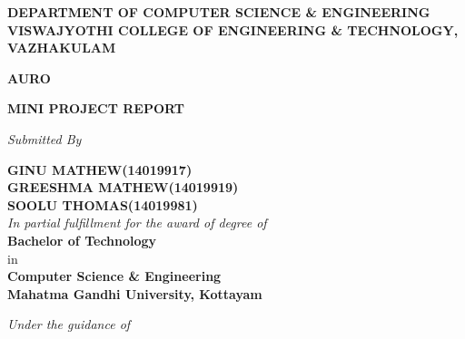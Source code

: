 \documentclass[a4 paper,11pt]{report}
\begin{document}
\begin{titlepage}
\begin{center}
        \vspace{0.4cm}
        
        \normalsize \textbf {DEPARTMENT OF COMPUTER SCIENCE \& ENGINEERING}\\
        \vspace{.4cm}
        \large \textbf {VISWAJYOTHI COLLEGE OF ENGINEERING \& TECHNOLOGY, VAZHAKULAM}
        
    \end{center}
\end{titlepage}

\begin{titlepage}
    \begin{center}
        
        \Huge
        \textbf{AURO}
        
        \vspace{.2cm}
        \large \textbf{MINI PROJECT REPORT}
        
        \vspace{.2cm}
		\textit{Submitted By}
		
		\vspace{.1cm}      
        \large \textbf{GINU MATHEW\hspace{21mm}(14019917)}\\
        \large \textbf{GREESHMA MATHEW\hspace{6mm}(14019919)}\\
        \large \textbf{SOOLU THOMAS\hspace{19mm}(14019981)}\\
        
        \vspace{.4cm}
        \textit{In partial fulfillment for the award of degree of} \\
        
        \vspace{.4cm}
        \large \textbf{Bachelor of Technology}\\
        \vspace{.1cm}
        in \\
        \vspace{.3cm}
        \large \textbf{Computer Science \& Engineering} \\
        \vspace{0.1cm}
		\large \textbf{Mahatma Gandhi University, Kottayam}
		
        \vspace{0.1cm}
		\textit{Under the guidance of}
		

\end{center}
\end{titlepage}
\end{document}
